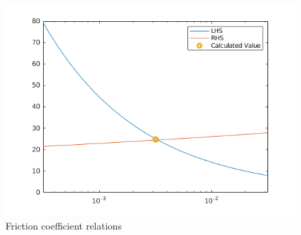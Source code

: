 \documentclass[12pt]{article}
\begin{document}
        \begin{figure}
                \centering
                \includegraphics[width=\textwidth]{friction.png}
                \caption{Friction coefficient relations}
                \label{fig:friction}
        \end{figure}



\end{document}
